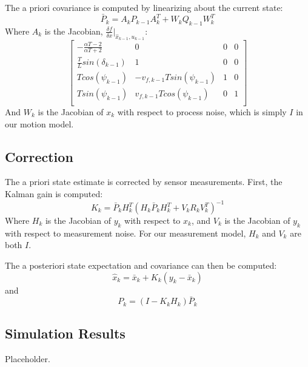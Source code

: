 \documentclass[11pt]{article} %
\begin{document}
The a priori covariance is computed by linearizing about the current state:
\begin{equation}
\bar{P}_k = A_kP_{k-1}A_k^T + W_kQ_{k-1}W_k^T
\end{equation}
Where $A_k$ is the Jacobian, $\frac{\delta f}{\delta x} | _{\hat{x}_{k-1}, u_{k-1}}$:
\renewcommand{\arraystretch}{1.4}
\begin{equation}
\left[ \begin{array}{cccc}
-\frac{\alpha T - 2}{\alpha T + 2} & 0 & 0 & 0 \\
\frac{T}{L} sin( \delta _{k-1} ) & 1 & 0 & 0 \\
T cos(\psi _{k-1}) & - v_{f,k-1} T sin( \psi _{k-1}) & 1 & 0 \\
T sin(\psi _{k-1}) & v_{f,k-1} T cos ( \psi _{k-1}) & 0 & 1 \\
\end{array} \right]
\end{equation}
\renewcommand{\arraystretch}{1}
And $W_k$ is the Jacobian of $x_k$ with respect to process noise, which is simply $I$ in our motion model.

\subsection{Correction}

The a priori state estimate is corrected by sensor measurements.  First, the Kalman gain is computed:
\begin{equation}
K_k = \bar{P}_k H_k^T ( H_k \bar{P}_k H_k^T + V_k R_k V_k^T ) ^{-1}
\end{equation}
Where $H_k$ is the Jacobian of $y_k$ with respect to $x_k$, and $V_k$ is the Jacobian of $y_k$ with respect to measurement noise.   For our measurement model, $H_k$ and $V_k$ are both $I$.

The a posteriori state expectation and covariance can then be computed:
\begin{equation}
\hat{x}_k = \bar{x}_k + K_k (y_k - \bar{x}_k)
\end{equation}
and
\begin{equation}
P_k = (I - K_k H_k) \bar{P}_k
\end{equation}

\subsection{Simulation Results}

Placeholder.
\end{document}
